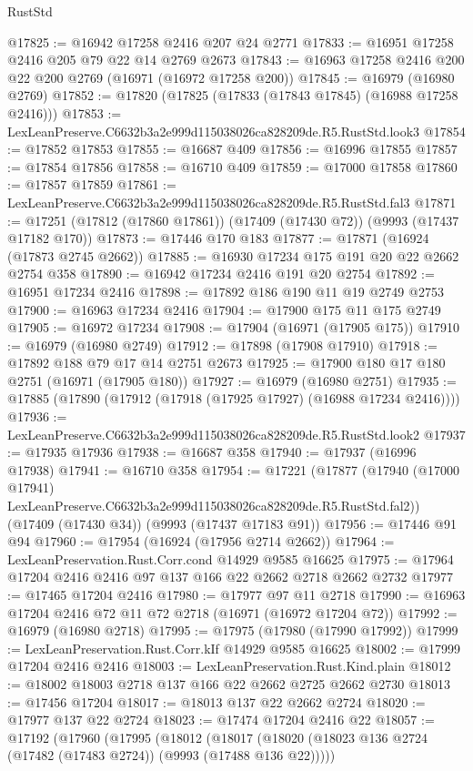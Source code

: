 \begin{lexlean}{RustStd}
\begin{coremodule}
@17825 := @16942 @17258 @2416 @207 @24 @2771
@17833 := @16951 @17258 @2416 @205 @79 @22 @14 @2769 @2673
@17843 := @16963 @17258 @2416 @200 @22 @200 @2769 (@16971 (@16972 @17258 @200))
@17845 := @16979 (@16980 @2769)
@17852 := @17820 (@17825 (@17833 (@17843 @17845) (@16988 @17258 @2416)))
@17853 := LexLeanPreserve.C6632b3a2e999d115038026ca828209de.R5.RustStd.look3
@17854 := @17852 @17853
@17855 := @16687 @409
@17856 := @16996 @17855
@17857 := @17854 @17856
@17858 := @16710 @409
@17859 := @17000 @17858
@17860 := @17857 @17859
@17861 := LexLeanPreserve.C6632b3a2e999d115038026ca828209de.R5.RustStd.fal3
@17871 := @17251 (@17812 (@17860 @17861)) (@17409 (@17430 @72)) (@9993 (@17437 @17182 @170))
@17873 := @17446 @170 @183
@17877 := @17871 (@16924 (@17873 @2745 @2662))
@17885 := @16930 @17234 @175 @191 @20 @22 @2662 @2754 @358
@17890 := @16942 @17234 @2416 @191 @20 @2754
@17892 := @16951 @17234 @2416
@17898 := @17892 @186 @190 @11 @19 @2749 @2753
@17900 := @16963 @17234 @2416
@17904 := @17900 @175 @11 @175 @2749
@17905 := @16972 @17234
@17908 := @17904 (@16971 (@17905 @175))
@17910 := @16979 (@16980 @2749)
@17912 := @17898 (@17908 @17910)
@17918 := @17892 @188 @79 @17 @14 @2751 @2673
@17925 := @17900 @180 @17 @180 @2751 (@16971 (@17905 @180))
@17927 := @16979 (@16980 @2751)
@17935 := @17885 (@17890 (@17912 (@17918 (@17925 @17927) (@16988 @17234 @2416))))
@17936 := LexLeanPreserve.C6632b3a2e999d115038026ca828209de.R5.RustStd.look2
@17937 := @17935 @17936
@17938 := @16687 @358
@17940 := @17937 (@16996 @17938)
@17941 := @16710 @358
@17954 := @17221
    (@17877
      (@17940 (@17000 @17941) LexLeanPreserve.C6632b3a2e999d115038026ca828209de.R5.RustStd.fal2))
    (@17409 (@17430 @34))
    (@9993 (@17437 @17183 @91))
@17956 := @17446 @91 @94
@17960 := @17954 (@16924 (@17956 @2714 @2662))
@17964 := LexLeanPreservation.Rust.Corr.cond @14929 @9585 @16625
@17975 := @17964 @17204 @2416 @2416 @97 @137 @166 @22 @2662 @2718 @2662 @2732
@17977 := @17465 @17204 @2416
@17980 := @17977 @97 @11 @2718
@17990 := @16963 @17204 @2416 @72 @11 @72 @2718 (@16971 (@16972 @17204 @72))
@17992 := @16979 (@16980 @2718)
@17995 := @17975 (@17980 (@17990 @17992))
@17999 := LexLeanPreservation.Rust.Corr.kIf @14929 @9585 @16625
@18002 := @17999 @17204 @2416 @2416
@18003 := LexLeanPreservation.Rust.Kind.plain
@18012 := @18002 @18003 @2718 @137 @166 @22 @2662 @2725 @2662 @2730
@18013 := @17456 @17204
@18017 := @18013 @137 @22 @2662 @2724
@18020 := @17977 @137 @22 @2724
@18023 := @17474 @17204 @2416 @22
@18057 := @17192
    (@17960
      (@17995
        (@18012
          (@18017 (@18020 (@18023 @136 @2724 (@17482 (@17483 @2724)) (@9993 (@17488 @136 @22)))))

\end{coremodule}
\end{lexlean}
